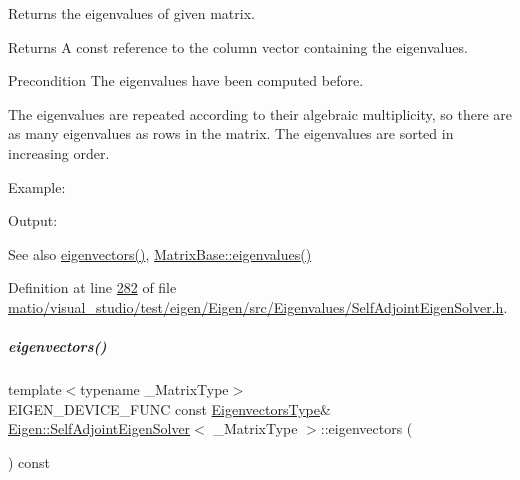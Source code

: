Returns the eigenvalues of given matrix. 

\begin{DoxyReturn}{Returns}
A const reference to the column vector containing the eigenvalues.
\end{DoxyReturn}
\begin{DoxyPrecond}{Precondition}
The eigenvalues have been computed before.
\end{DoxyPrecond}
The eigenvalues are repeated according to their algebraic multiplicity, so there are as many eigenvalues as rows in the matrix. The eigenvalues are sorted in increasing order.

Example\+: 
\begin{DoxyCodeInclude}
\end{DoxyCodeInclude}
 Output\+: 
\begin{DoxyVerbInclude}
\end{DoxyVerbInclude}


\begin{DoxySeeAlso}{See also}
\hyperlink{group___eigenvalues___module_a7b9f7e641fa46ac4c5f2371405c69b2b}{eigenvectors()}, \hyperlink{group___core___module_a30430fa3d5b4e74d312fd4f502ac984d}{Matrix\+Base\+::eigenvalues()} 
\end{DoxySeeAlso}


Definition at line \hyperlink{matio_2visual__studio_2test_2eigen_2_eigen_2src_2_eigenvalues_2_self_adjoint_eigen_solver_8h_source_l00282}{282} of file \hyperlink{matio_2visual__studio_2test_2eigen_2_eigen_2src_2_eigenvalues_2_self_adjoint_eigen_solver_8h_source}{matio/visual\+\_\+studio/test/eigen/\+Eigen/src/\+Eigenvalues/\+Self\+Adjoint\+Eigen\+Solver.\+h}.

\mbox{\label{group___eigenvalues___module_a7b9f7e641fa46ac4c5f2371405c69b2b}} 
\subparagraph{\texorpdfstring{eigenvectors()}{eigenvectors()}\hspace{0.1cm}{\footnotesize\ttfamily [1/2]}}
{\footnotesize\ttfamily template$<$typename \+\_\+\+Matrix\+Type$>$ \\
E\+I\+G\+E\+N\+\_\+\+D\+E\+V\+I\+C\+E\+\_\+\+F\+U\+NC const \hyperlink{group___core___module}{Eigenvectors\+Type}\& \hyperlink{group___eigenvalues___module_class_eigen_1_1_self_adjoint_eigen_solver}{Eigen\+::\+Self\+Adjoint\+Eigen\+Solver}$<$ \+\_\+\+Matrix\+Type $>$\+::eigenvectors (\begin{DoxyParamCaption}{ }\end{DoxyParamCaption}) const\hspace{0.3cm}{\ttfamily [inline]}}



